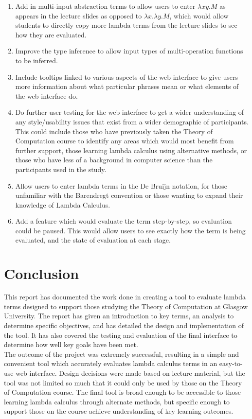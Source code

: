 \documentclass[a4paper,11pt]{report}
\begin{document}
\begin{enumerate}
	\item Add in multi-input abstraction terms to allow users to enter $\lambda xy.M$ as appears in the lecture slides \cite{Gay2019} as opposed to $\lambda x.\lambda y.M$, which would allow students to directly copy more lambda terms from the lecture slides to see how they are evaluated.
	\item Improve the type inference to allow input types of multi-operation functions to be inferred.
	\item Include tooltips linked to various aspects of the web interface to give users more information about what particular phrases mean or what elements of the web interface do.
	\item Do further user testing for the web interface to get a wider understanding of any style/usability issues that exist from a wider demographic of participants. This could include those who have previously taken the Theory of Computation course to identify any areas which would most benefit from further support, those learning lambda calculus using alternative methods, or those who have less of a background in computer science than the participants used in the study.
	\item Allow users to enter lambda terms in the De Bruijn notation, for those unfamiliar with the Barendregt convention or those wanting to expand their knowledge of Lambda Calculus.
	\item Add a feature which would evaluate the term step-by-step, so evaluation could be paused. This would allow users to see exactly how the term is being evaluated, and the state of evaluation at each stage.
\end{enumerate}

\chapter{Conclusion}
This report has documented the work done in creating a tool to evaluate lambda terms designed to support those studying the Theory of Computation at Glasgow University. The report has given an introduction to key terms, an analysis to determine specific objectives, and has detailed the design and implementation of the tool. It has also covered the testing and evaluation of the final interface to determine how well key goals have been met.\\

The outcome of the project was extremely successful, resulting in a simple and convenient tool which accurately evaluates lambda calculus terms in an easy-to-use web interface. Design decisions were made based on lecture material, but the tool was not limited so much that it could only be used by those on the Theory of Computation course. The final tool is broad enough to be accessible to those learning lambda calculus through alternate methods, but specific enough to support those on the course achieve understanding of key learning outcomes.\\
\end{document}
